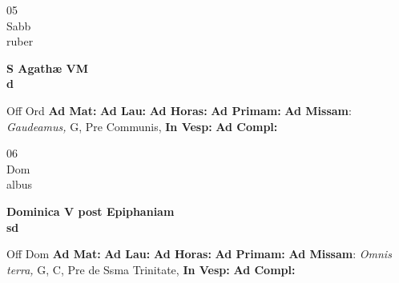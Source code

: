 \documentclass[10pt, openany]{book}
\begin{document}
    \begin{center}
        \begin{minipage}{3.5in}
            \vspace{2em}
            \begin{minipage}{0.5in}
                {\Huge 05} \\
                {\normalsize Sabb} \\
                {\normalsize ruber}
            \end{minipage}
            \begin{minipage}{3.0in}
                \textbf{ \large S Agathæ VM \\
                \textnormal{\normalsize d}} \\ 
            \end{minipage}
            \begin{justify}Off Ord
                \textbf{Ad Mat: }
                \textbf{Ad Lau: }
                \textbf{Ad Horas: }
                \textbf{Ad Primam: }\textbf{Ad Missam}: \textit{Gaudeamus,} G, Pre Communis,  
                \textbf{In Vesp: }
                \textbf{Ad Compl: }
            \end{justify}
        \end{minipage}
    \end{center}

    \begin{center}
        \begin{minipage}{3.5in}
            \vspace{2em}
            \begin{minipage}{0.5in}
                {\Huge 06} \\
                {\normalsize Dom} \\
                {\normalsize albus}
            \end{minipage}
            \begin{minipage}{3.0in}
                \textbf{ \large Dominica V post Epiphaniam \\
                \textnormal{\normalsize sd}} \\ 
            \end{minipage}
            \begin{justify}Off Dom
                \textbf{Ad Mat: }
                \textbf{Ad Lau: }
                \textbf{Ad Horas: }
                \textbf{Ad Primam: }\textbf{Ad Missam}: \textit{Omnis terra,} G, C, Pre de Ssma Trinitate,  
                \textbf{In Vesp: }
                \textbf{Ad Compl: }
            \end{justify}
        \end{minipage}
    \end{center}
\end{document}
